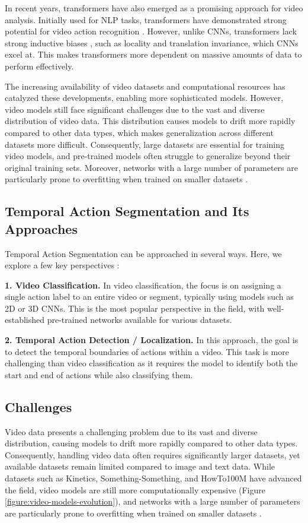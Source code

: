 In recent years, transformers have also emerged as a promising approach for video analysis. Initially used for NLP tasks, transformers have demonstrated strong potential for video action recognition \cite{vivit,dinov2,action-clip}. However, unlike CNNs, transformers lack strong inductive biases \cite{vit}, such as locality and translation invariance, which CNNs excel at. This makes transformers more dependent on massive amounts of data to perform effectively.

The increasing availability of video datasets and computational resources has catalyzed these developments, enabling more sophisticated models. However, video models still face significant challenges due to the vast and diverse distribution of video data. This distribution causes models to drift more rapidly compared to other data types, which makes generalization across different datasets more difficult. Consequently, large datasets are essential for training video models, and pre-trained models often struggle to generalize beyond their original training sets. Moreover, networks with a large number of parameters are particularly prone to overfitting when trained on smaller datasets \cite{r3d-paper}.

\subsection{Temporal Action Segmentation and Its Approaches}

Temporal Action Segmentation can be approached in several ways. Here, we explore a few key perspectives \cite{tas-survey}:

\noindent\textbf{1. Video Classification.} In video classification, the focus is on assigning a single action label to an entire video or segment, typically using models such as 2D or 3D CNNs. This is the most popular perspective in the field, with well-established pre-trained networks available for various datasets. 

\noindent\textbf{2. Temporal Action Detection / Localization.} In this approach, the goal is to detect the temporal boundaries of actions within a video. This task is more challenging than video classification as it requires the model to identify both the start and end of actions while also classifying them.

\subsection{Challenges}

Video data presents a challenging problem due to its vast and diverse distribution, causing models to drift more rapidly compared to other data types. Consequently, handling video data often requires significantly larger datasets, yet available datasets remain limited compared to image and text data. While datasets such as Kinetics, Something-Something, and HowTo100M have advanced the field, video models are still more computationally expensive (Figure \ref{figure:video-models-evolution}), and networks with a large number of parameters are particularly prone to overfitting when trained on smaller datasets \cite{resnet-3d}.